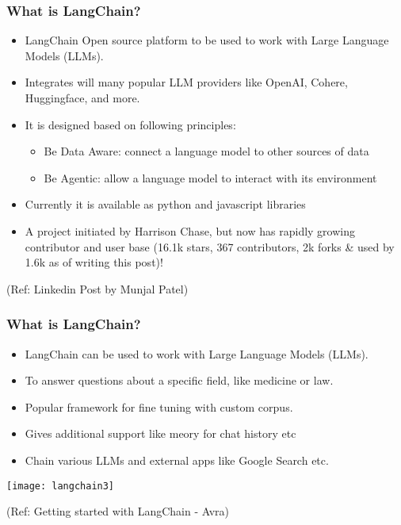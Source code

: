 \begin{frame}\frametitle{What is LangChain?}

\begin{itemize}
\item LangChain Open source platform to be used to work with Large Language Models (LLMs). 
\item Integrates will many popular LLM providers like OpenAI, Cohere, Huggingface, and more.  
\item It is designed based on following principles:
	\begin{itemize}
	\item Be Data Aware: connect a language model to other sources of data
	\item Be Agentic: allow a language model to interact with its environment
	\end{itemize}
\item Currently it is available as python and javascript libraries
\item A project initiated by Harrison Chase, but now has rapidly growing contributor and user base (16.1k stars, 367 contributors, 2k forks \& used by 1.6k as of writing this post)!
\end{itemize}

{\tiny (Ref: Linkedin Post by Munjal Patel)}
\end{frame}

\begin{frame}\frametitle{What is LangChain?}

\begin{itemize}
\item LangChain can be used to work with Large Language Models (LLMs). 
\item To answer questions about a specific field, like medicine or law. 
\item Popular framework for fine tuning with custom corpus.
\item Gives additional support like meory for chat history etc
\item Chain various LLMs and external apps like Google Search etc.
\end{itemize}

\begin{center}
\texttt{[image: langchain3]}
\end{center}	  


{\tiny (Ref: Getting started with LangChain - Avra)}
\end{frame}


